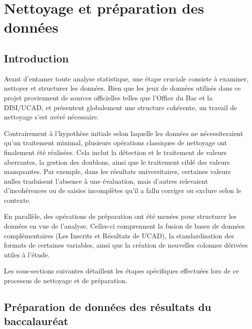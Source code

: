\chapter{Nettoyage et préparation des données}

\section{Introduction}
Avant d’entamer toute analyse statistique, une étape cruciale consiste à examiner, nettoyer et structurer les données. 
Bien que les jeux de données utilisés dans ce projet proviennent de sources officielles telles que l’Office du Bac et la DISI/UCAD, et présentent globalement une structure cohérente, un travail de nettoyage s’est avéré nécessaire.

Contrairement à l’hypothèse initiale selon laquelle les données ne nécessiteraient qu’un traitement minimal, plusieurs opérations classiques de nettoyage ont finalement été réalisées. 
Cela inclut la détection et le traitement de valeurs aberrantes, la gestion des doublons, ainsi que le traitement ciblé des valeurs manquantes. 
  Par exemple, dans les résultats universitaires, certaines valeurs nulles traduisent l'absence à une évaluation, mais d'autres relevaient d’incohérences ou de saisies incomplètes qu’il a fallu corriger ou exclure selon le contexte.

En parallèle, des opérations de préparation ont été menées pour structurer les données en vue de l’analyse. 
Celles-ci comprennent la fusion de bases de données complémentaires (Les Inscrits et Résultats de UCAD), la standardisation des formats de certaines variables, ainsi que la création de nouvelles colonnes dérivées utiles à l’étude.

Les sous-sections suivantes détaillent les étapes spécifiques effectuées lors de ce processus de nettoyage et de préparation.


\newpage
\section{Préparation de données des résultats du baccalauréat}

